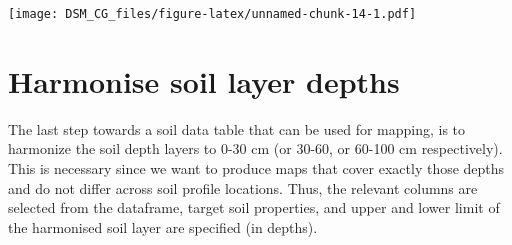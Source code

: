 \documentclass[
  10pt,
  b5paper,
  oneside]{book}
\newenvironment{Shaded}{\begin{snugshade}}{\end{snugshade}}
\newcommand{\AttributeTok}[1]{\textcolor[rgb]{0.77,0.63,0.00}{#1}}
\newcommand{\CommentTok}[1]{\textcolor[rgb]{0.56,0.35,0.01}{\textit{#1}}}
\newcommand{\DecValTok}[1]{\textcolor[rgb]{0.00,0.00,0.81}{#1}}
\newcommand{\FunctionTok}[1]{\textcolor[rgb]{0.00,0.00,0.00}{#1}}
\newcommand{\NormalTok}[1]{#1}
\newcommand{\OtherTok}[1]{\textcolor[rgb]{0.56,0.35,0.01}{#1}}
\newcommand{\SpecialCharTok}[1]{\textcolor[rgb]{0.00,0.00,0.00}{#1}}
\newcommand{\StringTok}[1]{\textcolor[rgb]{0.31,0.60,0.02}{#1}}
\begin{document}
\begin{Shaded}
\end{Shaded}

\texttt{[image: DSM\_CG\_files/figure-latex/unnamed-chunk-14-1.pdf]}

\hypertarget{harmonise-soil-layer-depths}{%
\section{Harmonise soil layer depths}\label{harmonise-soil-layer-depths}}

The last step towards a soil data table that can be used for mapping, is to harmonize the soil depth layers to 0-30 cm (or 30-60, or 60-100 cm respectively). This is necessary since we want to produce maps that cover exactly those depths and do not differ across soil profile locations. Thus, the relevant columns are selected from the dataframe, target soil properties, and upper and lower limit of the harmonised soil layer are specified (in depths).
\end{document}

